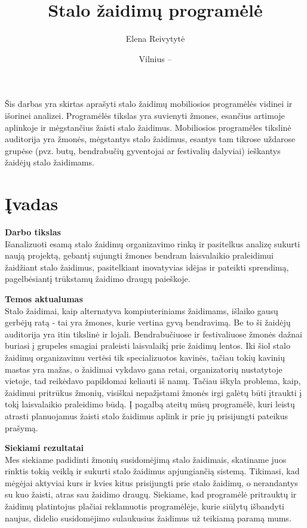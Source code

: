 \documentclass{VUMIFPSkursinis}
\title{Stalo žaidimų programėlė}
\author{Elena Reivytytė}
\date{Vilnius – \the\year}
\begin{document}
\maketitle

Šis darbas yra skirtas aprašyti stalo žaidimų mobiliosios programėlės vidinei ir išorinei analizei. 
Programėlės tikslas yra suvienyti žmones, esančius artimoje aplinkoje ir mėgstančius žaisti stalo žaidimus. 
Mobiliosios programėles tikslinė auditorija yra žmonės, mėgstantys stalo žaidimus, esantys tam 
tikrose uždarose grupėse (pvz. butų, bendrabučių gyventojai ar festivalių dalyviai) ieškantys žaidėjų stalo žaidimams. 

\tableofcontents

\section{Įvadas}
\textbf{Darbo tikslas}\\
Išanalizuoti esamą stalo žaidimų organizavimo rinką ir pasitelkus analizę sukurti naują projektą, 
gebantį sujungti žmones bendram laisvalaikio praleidimui žaidžiant stalo žaidimus, pasitelkiant 
inovatyvias idėjas ir pateikti sprendimą, pagelbėsiantį trūkstamų žaidimo draugų paieškoje.

\textbf{Temos aktualumas}\\
Stalo žaidimai, kaip alternatyva kompiuteriniams žaidimams, išlaiko gausų gerbėjų ratą - tai 
yra žmones, kurie vertina gyvą bendravimą. Be to ši žaidėjų auditorija yra itin tikslinė ir 
lojali. Bendrabučiuose ir festivaliuose žmonės dažnai buriasi į grupeles smagiai praleisti 
laisvalaikį prie žaidimų lentos. Iki šiol stalo žaidimų organizavimu vertėsi tik specializuotos 
kavinės, tačiau tokių kavinių mastas yra mažas, o žaidimai vykdavo gana retai, organizatorių 
nustatytoje vietoje, tad reikėdavo papildomai keliauti iš namų. Tačiau iškyla problema, kaip, 
žaidimui pritrūkus žmonių, visiškai nepažįstami žmonės irgi galėtų būti įtraukti į tokį laisvalaikio 
praleidimo būdą. Į pagalbą ateitų mūsų programėlė, kuri leistų atrasti planuojamus žaisti stalo 
žaidimus aplink ir prie jų prisijungti pateikus prašymą.

\textbf{Siekiami rezultatai}\\
Mes siekiame padidinti žmonių susidomėjimą stalo žaidimais, skatiname juos rinktis tokią veiklą 
ir sukurti stalo žaidimus apjungiančią sistemą. Tikimasi, kad mėgėjai aktyviai kurs ir kvies 
kitus prisijungti prie stalo žaidimų, o nerandantys su kuo žaisti, atras sau žaidimo draugų. 
Siekiame, kad programėlė pritrauktų ir žaidimų platintojus plačiai reklamuotis programėlėje, 
kurie siūlytų išbandyti naujus, didelio susidomėjimo sulaukusius žaidimus už teikiamą paramą mums.
\end{document}
